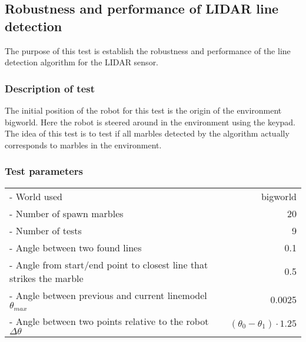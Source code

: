 \documentclass[../Head/Main.tex]{subfiles}
\begin{document}
\subsection{Robustness and performance of LIDAR line detection}
\label{test:LineDetection}

The purpose of this test is establish the robustness and performance of the line detection algorithm for the LIDAR sensor.

\subsubsection*{Description of test}
The initial position of the robot for this test is the origin of the environment bigworld. Here the robot is steered around in the environment using the keypad. The idea of this test is to test if all marbles detected by the algorithm actually corresponds to marbles in the environment.     

\subsubsection*{Test parameters}
\begin{tabular}{l r}
	- World used                & bigworld\\	
	- Number of spawn marbles   & 20\\
	- Number of tests           & 9\\
	- Angle between two found lines & 0.1\\
	- Angle from start/end point to closest line that strikes the marble & 0.5\\
	- Angle between previous and current linemodel $\theta_{max}$ & 0.0025 \\
	- Angle between two points relative to the robot $\Delta\theta$ & $\left(\theta_0 - \theta_1\right) \cdot 1.25$ 
\end{tabular}
\end{document}
